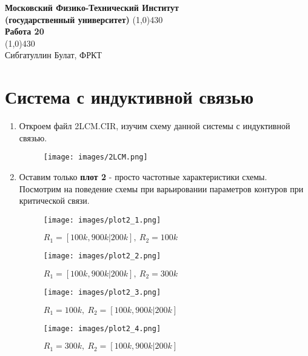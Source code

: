 \documentclass[a4paper, 12pt]{article}%
\begin{document}
\begin{titlepage}

\begin{center}
\large\textbf{Московский Физико-Технический Институт}\\
\large\textbf{(государственный университет)}
\vfill
\line(1,0){430}\\[1mm]
\huge\textbf{Работа 20}\\
\line(1,0){430}\\[1mm]
\vfill
\large Сибгатуллин Булат, ФРКТ\\
\end{center}

\end{titlepage}

\section{Система с индуктивной связью}

\begin{enumerate}

\item Откроем файл 2LCM.CIR, изучим схему данной системы с индуктивной связью.

\begin{figure}[h!]
\centering
\texttt{[image: images/2LCM.png]}
\label{fig:Image1}
\end{figure}

\item Оставим только \textbf{плот 2} - просто частотные характеристики схемы. Посмотрим на поведение схемы при варьировании параметров контуров при критической связи.

\begin{figure}[h!]
\centering
\texttt{[image: images/plot2\_1.png]}
\caption{$R_1 = [100k, 900k|200k], \: R_2 = 100k$}
\label{fig:Image1}
\end{figure}

\begin{figure}[h!]
\centering
\texttt{[image: images/plot2\_2.png]}
\caption{$R_1 = [100k, 900k|200k], \: R_2 = 300k$}
\label{fig:Image1}
\end{figure}

\begin{figure}[h!]
\centering
\texttt{[image: images/plot2\_3.png]}
\caption{$R_1 = 100k, \: R_2 = [100k, 900k|200k]$}
\label{fig:Image1}
\end{figure}

\begin{figure}[h!]
\centering
\texttt{[image: images/plot2\_4.png]}
\caption{$R_1 = 300k, \: R_2 = [100k, 900k|200k]$}
\label{fig:Image1}
\end{figure}

\end{enumerate}
\end{document}
